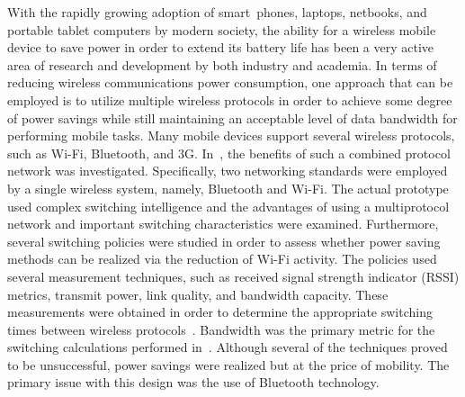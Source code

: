 \documentclass[conference]{IEEEtran}
\begin{document}
With the rapidly growing adoption of smart~phones, laptops,
netbooks, and portable tablet computers by modern society, the
ability for a wireless mobile device to save power in order to
extend its battery life has been a very active area of research and
development by both industry and academia. In terms of reducing
wireless communications power consumption, one approach that can be
employed is to utilize multiple wireless protocols in order to
achieve some degree of power savings while still maintaining an
acceptable level of data bandwidth for performing mobile tasks. Many
mobile devices support several wireless protocols, such as Wi-Fi,
Bluetooth, and 3G.  In~\cite{six}, the benefits of such a combined
protocol network was investigated.  Specifically, two networking
standards were employed by a single wireless system, namely,
Bluetooth and Wi-Fi. The actual prototype used complex switching
intelligence and the advantages of using a multiprotocol network and
important switching characteristics were examined.  Furthermore,
several switching policies were studied in order to assess whether
power saving methods can be realized via the reduction of Wi-Fi
activity. The policies used several measurement techniques, such as
received signal strength indicator (RSSI) metrics, transmit power,
link quality, and bandwidth capacity.  These measurements were
obtained in order to determine the appropriate switching times
between wireless protocols~\cite{six}. Bandwidth was the primary
metric for the switching calculations performed in~\cite{six}.
Although several of the techniques proved to be unsuccessful, power
savings were realized but at the price of mobility.  The primary
issue with this design was the use of Bluetooth technology.
\end{document}
